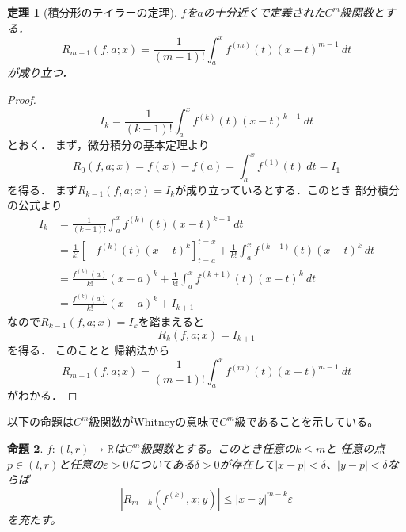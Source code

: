 \documentclass[leqno, a4paper, 12pt]{jsarticle}
\newtheorem{thm}{定理}
\newtheorem{prop}[thm]{命題}
\newcommand{\rr}{\mathbb{R}}
\newcommand{\ep}{\varepsilon}
\newcommand{\bbb}[2]{#1^{(#2)}}
\begin{document}
\begin{thm}[積分形のテイラーの定理]
$f$を$a$の十分近くで定義された$C^{m}$級関数とする．
\[
R_{m-1}(f, a; x)=
\frac{1}{(m-1)!}\int_{a}^{x}\bbb{f}{m}(t)(x-t)^{m-1}\ dt
\]
が成り立つ．
\end{thm}
\begin{proof}
\[
I_{k}=\frac{1}{(k-1)!}\int_{a}^{x}\bbb{f}{k}(t)(x-t)^{k-1}\ dt
\]
とおく．
まず，微分積分の基本定理より
\[
R_{0}(f, a; x)=f(x)-f(a)=\int_{a}^{x}\bbb{f}{1}(t)\ dt=I_{1}
\]
を得る．
まず$R_{k-1}(f, a; x)=I_{k}$が成り立っているとする．このとき
部分積分の公式より
\begin{align*}
I_{k}&=\frac{1}{(k-1)!}\int_{a}^{x}\bbb{f}{k}(t)(x-t)^{k-1}\ dt\\
&=
\frac{1}{k!}
\left[
-
\bbb{f}{k}(t)(x-t)^{k}
\right]_{t=a}^{t=x}
+\frac{1}{k!}\int_{a}^{x}\bbb{f}{k+1}(t)(x-t)^{k}\ dt\\
&=\frac{\bbb{f}{k}(a)}{k!}(x-a)^{k}
+\frac{1}{k!}\int_{a}^{x}\bbb{f}{k+1}(t)(x-t)^{k}\ dt\\
&=
\frac{\bbb{f}{k}(a)}{k!}(x-a)^{k}+I_{k+1}
\end{align*}
なので$R_{k-1}(f, a; x)=I_{k}$を踏まえると
\[
R_{k}(f, a; x)=I_{k+1}
\]
を得る．
このことと
帰納法から
\[
R_{m-1}(f, a; x)=
\frac{1}{(m-1)!}\int_{a}^{x}\bbb{f}{m}(t)(x-t)^{m-1}\ dt
\]
がわかる．
\end{proof}
以下の命題は$C^m$級関数がWhitneyの意味で$C^m$級であることを示している。
\begin{prop}$f:(l,r)\to \rr$は$C^m$級関数とする。このとき任意の$k\le m$と
任意の点$p\in (l,r)$と任意の$\ep>0$についてある$\delta>0$が存在して$|x-p|<\delta$、$|y-p|<\delta$ならば
\[
|R_{m-k}(f^{(k)}, x;y)|\le|x-y|^{m-k}\ep
\]
を充たす。
\end{prop}
\end{document}
